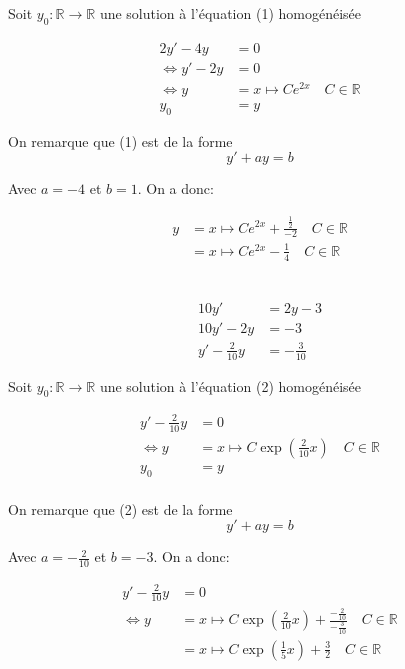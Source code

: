 \documentclass{article}
\newcommand{\R}{\mathds{R}}
\begin{document}
Soit $y_0: \R \to \R$ une solution à l'équation (1) homogénéisée

\begin{align*}
	2y'-4y&= 0 \\
	\iff y' - 2y &= 0 \\
	\iff y &= x \mapsto Ce^{2x} \quad C \in \R \\
	y_0 &= y
\end{align*}

On remarque que (1) est de la forme 
\[
	y' + ay = b
\] 

Avec $a = -4$ et $b = 1$.
On a donc:

\begin{align*}
	y &= x \mapsto Ce^{2x} + \frac{\frac{1}{2}}{-2} \quad C\in \R \\
	&= x \mapsto Ce^{2x} - \frac{1}{4} \quad C\in \R \\
\end{align*}

\subsection{}

\begin{align}
	10y' &= 2y - 3 \nonumber \\
	10y' - 2y &= -3 \nonumber \\
	y' - \frac{2}{10}y &= -\frac{3}{10}
\end{align}

Soit $y_0: \R \to \R$ une solution à l'équation (2) homogénéisée

\begin{align*}
	y' - \frac{2}{10}y &= 0 \\
	\iff y &= x \mapsto C\exp\left( \frac{2}{10}x \right) \quad C\in \R \\
	y_0 &= y \\
\end{align*}

On remarque que (2) est de la forme 
\[
	y' + ay = b
\] 

Avec $a = -\frac{2}{10}$ et $b = -3$.
On a donc:

\begin{align*}
	y'-\frac{2}{10}y&= 0 \\
	\iff y&= x\mapsto C\exp\left( \frac{2}{10}x \right) +\frac{-\frac{2}{10}}{-\frac{3}{10}} \quad C \in \R\\
           &= x\mapsto C\exp\left( \frac{1}{5}x \right) + \frac{3}{2} \quad C \in \R\\
\end{align*}
\end{document}
